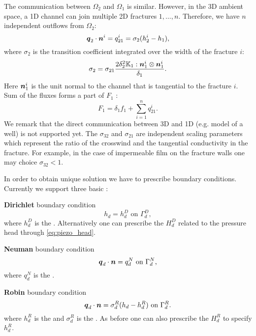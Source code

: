 The communication between $\Omega_2$  and  $\Omega_1$ is similar.  However, in the 3D ambient space,
a 1D channel can join multiple 2D fractures $1,\dots, n$. Therefore, we have $n$
independent outflows from $\Omega_2$:
\begin{equation*}
        \mathbf{\boldsymbol{q}}_2\cdot \mathbf{\boldsymbol{n}}^{i} = q_{21}^{i} =\sigma_{2} (h_2^{i}-h_1),
\end{equation*}
where $\sigma_2$  is the transition coefficient integrated over the width of the fracture $i$:
\[
\label{e:sigma2_law}
  \sigma_2 = \sigma_{21} \frac{2\delta_2^2\tn K_1:{\vc n_1^i}\otimes{\vc n_1^i}}{\delta_1}.
\]
Here $\mathbf{\boldsymbol{n}}_1^i$ is the unit normal to the channel that is tangential to the fracture $i$.
Sum of the fluxes forms a part of $F_1$ :
\begin{equation}
   \label{source_1D}
   F_1 = \delta_1 f_1 + \sum_{i=1}^n q_{21}^{i}. 
\end{equation}
We remark that the direct communication between 3D and 1D (e.g. model of a well) is not supported yet.
The  
{$\sigma_{32}$} \units{}{}{} and
{$\sigma_{21}$} \units{}{}{} are independent scaling parameters which represent 
the ratio of the crosswind and the tangential conductivity in the fracture. For example, in the case of impermeable film
on the fracture walls one may choice $\sigma_{32} < 1$.

In order to obtain unique solution we have to prescribe boundary conditions. Currently we support three basic 
:

{\bf Dirichlet} boundary condition
\[
    h_d = h_d^D        \text{ on }\Gamma_d^D,
\]
where $h_d^D$  is the  .
Alternatively one can prescribe the 
$H_d^D$  related to the pressure head through \eqref{eq:piezo_head}.

{\bf Neuman} boundary condition
\[
    \mathbf{\boldsymbol{q}}_d \cdot \mathbf{\boldsymbol{n}} = q_d^N         \text{ on }\Gamma_d^N,
\]
where $q_d^N$  is the .

{\bf Robin} boundary condition 
\[
    \mathbf{\boldsymbol{q}}_d \cdot \mathbf{\boldsymbol{n}} = \sigma_d^R ( h_d - h_d^R)     \text{ on }\Gamma_d^R.
\]
where $h_d^R$ is the  and
$\sigma_d^R$   
is the .
As before one can also prescribe the 
$H_d^R$ to specify $h_d^R$.

